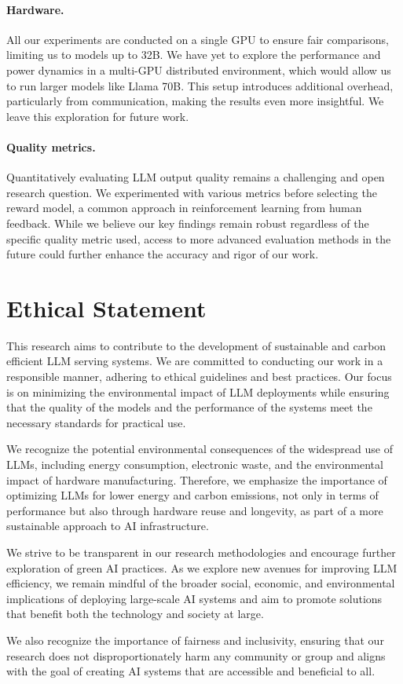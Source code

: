 \paragraph{Hardware.} All our experiments are conducted on a single GPU to ensure fair comparisons, limiting us to models up to 32B. We have yet to explore the performance and power dynamics in a multi-GPU distributed environment, which would allow us to run larger models like Llama 70B. This setup introduces additional overhead, particularly from communication, making the results even more insightful. We leave this exploration for future work.

\paragraph{Quality metrics.} Quantitatively evaluating LLM output quality remains a challenging and open research question. We experimented with various metrics before selecting the reward model, a common approach in reinforcement learning from human feedback. While we believe our key findings remain robust regardless of the specific quality metric used, access to more advanced evaluation methods in the future could further enhance the accuracy and rigor of our work.


\section*{Ethical Statement}

This research aims to contribute to the development of sustainable and carbon efficient LLM serving systems. We are committed to conducting our work in a responsible manner, adhering to ethical guidelines and best practices. Our focus is on minimizing the environmental impact of LLM deployments while ensuring that the quality of the models and the performance of the systems meet the necessary standards for practical use.

We recognize the potential environmental consequences of the widespread use of LLMs, including energy consumption, electronic waste, and the environmental impact of hardware manufacturing. Therefore, we emphasize the importance of optimizing LLMs for lower energy and carbon emissions, not only in terms of performance but also through hardware reuse and longevity, as part of a more sustainable approach to AI infrastructure.

We strive to be transparent in our research methodologies and encourage further exploration of green AI practices. As we explore new avenues for improving LLM efficiency, we remain mindful of the broader social, economic, and environmental implications of deploying large-scale AI systems and aim to promote solutions that benefit both the technology and society at large.

We also recognize the importance of fairness and inclusivity, ensuring that our research does not disproportionately harm any community or group and aligns with the goal of creating AI systems that are accessible and beneficial to all.
